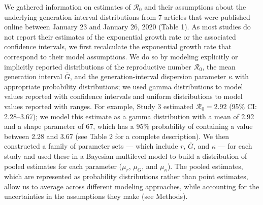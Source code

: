 \documentclass[12pt]{article}
\newcommand{\Ro}{\ensuremath{{\mathcal R}_{0}}\xspace}
\begin{document}
We gathered information on estimates of \Ro and their assumptions about the underlying generation-interval distributions from 7 articles that were published online between January 23 and January 26, 2020 (Table 1).
As most studies do not report their estimates of the exponential growth rate or the associated confidence intervals, we first recalculate the exponential growth rate that correspond to their model assumptions.
We do so by modeling explicitly or implicitly reported distributions of the reproductive number \Ro, the mean generation interval $\bar G$, and the generation-interval dispersion parameter $\kappa$ with appropriate probability distributions;
we used gamma distributions to model values reported with confidence intervals and uniform distributions to model values reported with ranges.
For example, Study 3 estimated $\Ro = 2.92$ (95\% CI: 2.28--3.67);
we model this estimate as a gamma distribution with a mean of 2.92 and a shape parameter of 67, which has a 95\% probability of containing a value between 2.28 and 3.67 (see Table 2 for a complete description).
We then constructed a family of parameter sets --- which include $r$, $\bar G$, and $\kappa$ --- for each study and used these in a Bayesian multilevel model to build a distribution of pooled estimates for each parameter ($\mu_r$, $\mu_G$, and $\mu_\kappa$).
The pooled estimates, which are represented as probability distributions rather than point estimates, allow us to average across different modeling approaches, while accounting for the uncertainties in the assumptions they make (see Methods).
\end{document}
